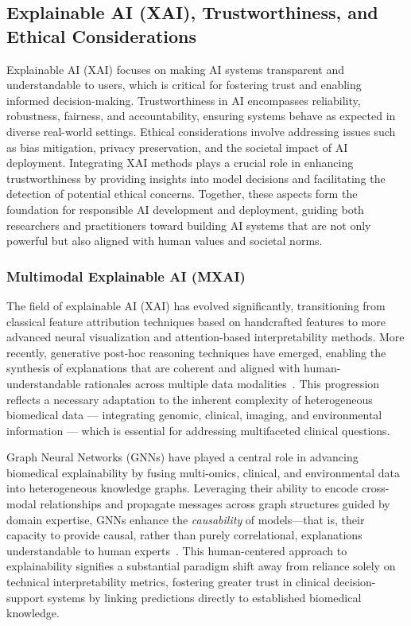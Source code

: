 \documentclass[sigconf]{acmart}
\begin{document}
\subsection{Explainable AI (XAI), Trustworthiness, and Ethical Considerations}
Explainable AI (XAI) focuses on making AI systems transparent and understandable to users, which is critical for fostering trust and enabling informed decision-making. Trustworthiness in AI encompasses reliability, robustness, fairness, and accountability, ensuring systems behave as expected in diverse real-world settings. Ethical considerations involve addressing issues such as bias mitigation, privacy preservation, and the societal impact of AI deployment. Integrating XAI methods plays a crucial role in enhancing trustworthiness by providing insights into model decisions and facilitating the detection of potential ethical concerns. Together, these aspects form the foundation for responsible AI development and deployment, guiding both researchers and practitioners toward building AI systems that are not only powerful but also aligned with human values and societal norms.

\subsubsection{Multimodal Explainable AI (MXAI)}

The field of explainable AI (XAI) has evolved significantly, transitioning from classical feature attribution techniques based on handcrafted features to more advanced neural visualization and attention-based interpretability methods. More recently, generative post-hoc reasoning techniques have emerged, enabling the synthesis of explanations that are coherent and aligned with human-understandable rationales across multiple data modalities~\cite{ref13,ref24,ref25}. This progression reflects a necessary adaptation to the inherent complexity of heterogeneous biomedical data — integrating genomic, clinical, imaging, and environmental information — which is essential for addressing multifaceted clinical questions.

Graph Neural Networks (GNNs) have played a central role in advancing biomedical explainability by fusing multi-omics, clinical, and environmental data into heterogeneous knowledge graphs. Leveraging their ability to encode cross-modal relationships and propagate messages across graph structures guided by domain expertise, GNNs enhance the \textit{causability} of models—that is, their capacity to provide causal, rather than purely correlational, explanations understandable to human experts~\cite{ref24}. This human-centered approach to explainability signifies a substantial paradigm shift away from reliance solely on technical interpretability metrics, fostering greater trust in clinical decision-support systems by linking predictions directly to established biomedical knowledge.
\end{document}
